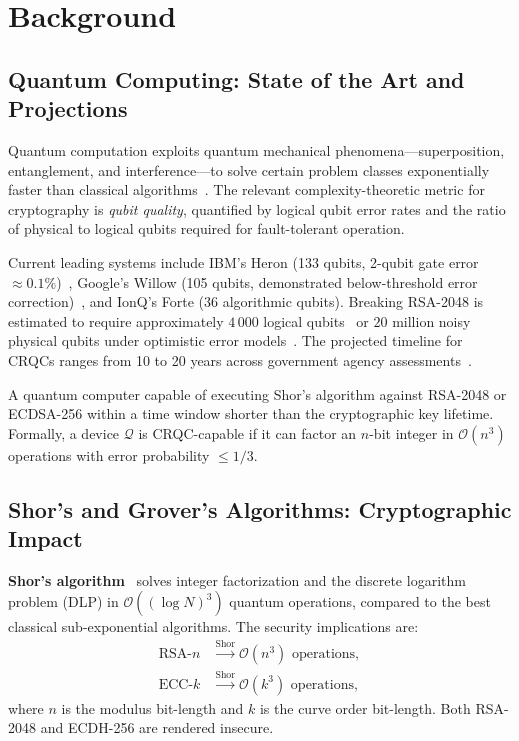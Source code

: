 \documentclass[journal]{IEEEtran}
\begin{document}
\section{Background}
\label{sec:background}

\subsection{Quantum Computing: State of the Art and Projections}

Quantum computation exploits quantum mechanical phenomena---superposition,
entanglement, and interference---to solve certain problem classes exponentially
faster than classical algorithms~\cite{nielsen2010quantum}. The relevant
complexity-theoretic metric for cryptography is \emph{qubit quality}, quantified
by logical qubit error rates and the ratio of physical to logical qubits
required for fault-tolerant operation.

Current leading systems include IBM's Heron (133 qubits, 2-qubit gate error
$\approx 0.1\%$)~\cite{ibm2024heron}, Google's Willow (105 qubits, demonstrated
below-threshold error correction)~\cite{google2024willow}, and IonQ's Forte
(36 algorithmic qubits). Breaking RSA-2048 is estimated to require
approximately $4\,000$ logical qubits~\cite{banegas2021concrete} or
$20$ million noisy physical qubits under optimistic error models~\cite{webber2022impact}.
The projected timeline for CRQCs ranges from 10 to 20 years across government
agency assessments~\cite{mosca2018cybersecurity,odni2023atr}.

\begin{definition}
A quantum computer capable of executing Shor's algorithm against RSA-2048 or
ECDSA-256 within a time window shorter than the cryptographic key lifetime.
Formally, a device $\mathcal{Q}$ is CRQC-capable if it can factor an
$n$-bit integer in $\mathcal{O}(n^3)$ operations with error probability
$\leq 1/3$.
\end{definition}

\subsection{Shor's and Grover's Algorithms: Cryptographic Impact}

\textbf{Shor's algorithm}~\cite{shor1994algorithms} solves integer factorization
and the discrete logarithm problem (DLP) in $\mathcal{O}((\log N)^3)$ quantum
operations, compared to the best classical sub-exponential algorithms. The
security implications are:
\begin{align}
  \text{RSA-}n &\xrightarrow{\text{Shor}} \mathcal{O}(n^3) \text{ operations}, \\
  \text{ECC-}k &\xrightarrow{\text{Shor}} \mathcal{O}(k^3) \text{ operations},
\end{align}
where $n$ is the modulus bit-length and $k$ is the curve order bit-length.
Both RSA-2048 and ECDH-256 are rendered insecure.
\end{document}
